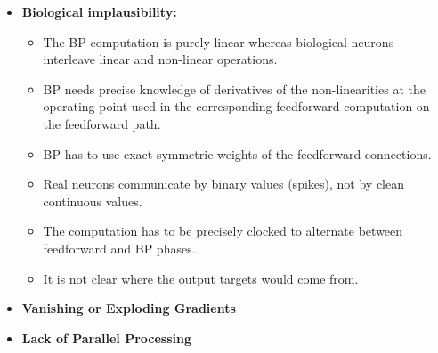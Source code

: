 \documentclass[a4paper, nobind]{templates/ociamthesis}
\begin{document}
\begin{itemize}
    \item \textbf{Biological implausibility:}
    \begin{itemize}
        \item The BP computation is purely linear whereas biological neurons interleave linear and non-linear operations.
        \item BP needs precise knowledge of derivatives of the non-linearities at the operating point used in the corresponding feedforward computation on the feedforward path.
        \item BP has to use exact symmetric weights of the feedforward connections.
        \item Real neurons communicate by binary values (spikes), not by clean continuous values.
        \item The computation has to be precisely clocked to alternate between feedforward and BP phases.
        \item It is not clear where the output targets would come from.
        \cite{bengio2016biologically, lee2015difference} 
    \end{itemize}  
    \item \textbf{Vanishing or Exploding Gradients}
    \item \textbf{Lack of Parallel Processing} \cite{ma2019hsic}
\end{itemize}
\end{document}
